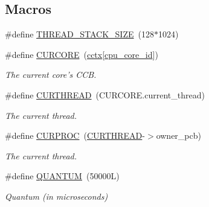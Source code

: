 \subsection*{Macros}
\begin{DoxyCompactItemize}
\item 
\#define \hyperlink{group__scheduler_ga90b7a8cb7bc3fdbd98014a3e15ee6e9a}{T\-H\-R\-E\-A\-D\-\_\-\-S\-T\-A\-C\-K\-\_\-\-S\-I\-Z\-E}~(128$\ast$1024)
\item 
\hypertarget{group__scheduler_ga869aabe01f7b28027376354dd895b96b}{\#define \hyperlink{group__scheduler_ga869aabe01f7b28027376354dd895b96b}{C\-U\-R\-C\-O\-R\-E}~(\hyperlink{group__scheduler_ga3be3b151b275926dff3fb99bee765eab}{cctx}\mbox{[}\hyperlink{bios_8h_abac58ced7d51f54f2318b326bc991933}{cpu\-\_\-core\-\_\-id}\mbox{]})}\label{group__scheduler_ga869aabe01f7b28027376354dd895b96b}

\begin{DoxyCompactList}\small\item\em The current core's C\-C\-B. \end{DoxyCompactList}\item 
\#define \hyperlink{group__scheduler_ga587a82c8931f0df72f43cc913ceb7e27}{C\-U\-R\-T\-H\-R\-E\-A\-D}~(C\-U\-R\-C\-O\-R\-E.\-current\-\_\-thread)
\begin{DoxyCompactList}\small\item\em The current thread. \end{DoxyCompactList}\item 
\#define \hyperlink{group__scheduler_gae3437e8e6787ef05b6576d03c5b6a0ca}{C\-U\-R\-P\-R\-O\-C}~(\hyperlink{group__scheduler_ga587a82c8931f0df72f43cc913ceb7e27}{C\-U\-R\-T\-H\-R\-E\-A\-D}-\/$>$owner\-\_\-pcb)
\begin{DoxyCompactList}\small\item\em The current thread. \end{DoxyCompactList}\item 
\#define \hyperlink{group__scheduler_gabc4f0f9abea1b5443308e4ea84b52b21}{Q\-U\-A\-N\-T\-U\-M}~(50000\-L)
\begin{DoxyCompactList}\small\item\em Quantum (in microseconds) \end{DoxyCompactList}\end{DoxyCompactItemize}
